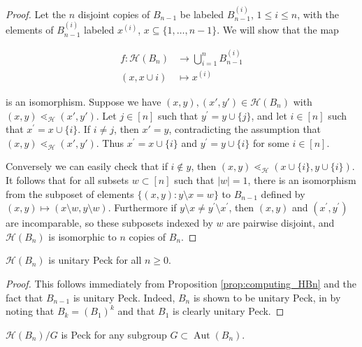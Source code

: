 \documentclass[smallextended]{svjour3}       %
\numberwithin{equation}{section}
\newcommand\Aut{\operatorname{Aut}}
\begin{document}
\begin{proof}
Let the $n$ disjoint copies of $B_{n-1}$ be labeled $B_{n-1}^{(i)}$, $1\le i\le n$, with the elements of $B_{n-1}^{(i)}$ labeled $x^{(i)}$, $x\subseteq \{1,\ldots,n-1\}$.  We will show that the map 

\begin{align*}
f\colon \mathcal{H}(B_n) &\longrightarrow \bigcup_{i=1}^n B_{n-1}^{(i)}\\
(x,x\cup{i})&\longmapsto x^{(i)}
\end{align*}

\noindent is an isomorphism.  Suppose we have $(x, y),(x', y') \in \mathcal H(B_n)$ with $(x, y) \lessdot_{\mathcal H} (x', y')$. Let $j\in [n]$ such that $y^\prime = y\cup\{j\}$, and let $i\in [n]$ such that $x^\prime = x\cup \{i\}$. If $i \ne j$, then $x' = y$, contradicting the assumption that $(x, y) \lessdot_{\mathcal H} (x', y')$. Thus $x^\prime = x\cup\{i\}$ and $y^\prime = y\cup\{i\}$ for some $i\in [n]$.

Conversely we can easily check that if $i\not\in y$, then $(x, y)\lessdot_{\mathcal{H}} (x\cup\{i\}, y\cup\{i\})$.  It follows that for all subsets $w \subset [n]$ such that $|w| = 1$, there is an isomorphism from the subposet of elements $\{(x, y)\colon y\setminus x = w\}$ to $B_{n-1}$ defined by $(x,y)\mapsto (x\setminus w,y\setminus w)$.  Furthermore if $y\setminus x \ne y^\prime \setminus x^\prime$, then $(x, y)$ and $(x^\prime, y^\prime)$ are incomparable, so these subposets indexed by $w$ are pairwise disjoint, and $\mathcal H(B_n)$ is isomorphic to $n$ copies of $B_{n}$.
\end{proof}

\begin{corollary}\label{cor:HBn_unitary_peck}
$\mathcal H(B_n)$ is unitary Peck for all $n\ge 0$.
\end{corollary}

\begin{proof}
This follows immediately from Proposition \ref{prop:computing_HBn} and the fact that $B_{n-1}$ is unitary Peck.  Indeed, $B_n$ is shown to be unitary Peck, in \cite[Theorem 2a]{quotients_stanley} by noting that $B_k = (B_1)^k$ and that $B_1$ is clearly unitary Peck.
\end{proof}

\begin{corollary}\label{cor:quotients_of_HBn_peck}
$\mathcal H(B_n)/G$ is Peck for any subgroup $G\subset \Aut(B_n)$.
\end{corollary}
\end{document}
